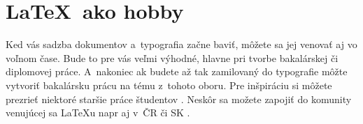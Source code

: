 \documentclass[11pt,a4paper,titlepage]{article}
\begin{document}
\section{\LaTeX ~ako hobby}
Ked vás sadzba dokumentov a~typografia začne baviť, môžete sa jej venovať aj vo voľnom čase. Bude to pre vás veľmi výhodné, hlavne pri tvorbe bakalárskej či diplomovej práce. A~nakoniec ak budete až tak zamilovaný do typografie môžte vytvoriť bakalársku prácu na tému z~tohoto oboru. Pre inšpiráciu si môžete prezrieť niektoré staršie práce študentov \cite{Polak:Pismo_pro_3D_zapisovac} \cite{Bednar:Tvorba_pisma_OpenType}. Neskôr sa možete zapojiť do komunity venujúcej sa \LaTeX u napr aj v~ČR či SK \cite{CSTug:web}.

\newpage

\end{document}

